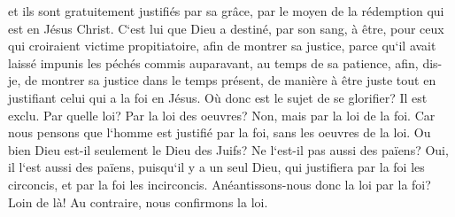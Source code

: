 \verse et ils sont gratuitement justifiés par sa grâce, par le moyen de la rédemption qui est en Jésus Christ. 
\verse C`est lui que Dieu a destiné, par son sang, à être, pour ceux qui croiraient victime propitiatoire, afin de montrer sa justice, parce qu`il avait laissé impunis les péchés commis auparavant, au temps de sa patience, afin, dis-je, 
\verse de montrer sa justice dans le temps présent, de manière à être juste tout en justifiant celui qui a la foi en Jésus. 
\verse Où donc est le sujet de se glorifier? Il est exclu. Par quelle loi? Par la loi des oeuvres? Non, mais par la loi de la foi. 
\verse Car nous pensons que l`homme est justifié par la foi, sans les oeuvres de la loi. 
\verse Ou bien Dieu est-il seulement le Dieu des Juifs? Ne l`est-il pas aussi des païens? Oui, il l`est aussi des païens, 
\verse puisqu`il y a un seul Dieu, qui justifiera par la foi les circoncis, et par la foi les incirconcis. 
\verse Anéantissons-nous donc la loi par la foi? Loin de là! Au contraire, nous confirmons la loi. 

